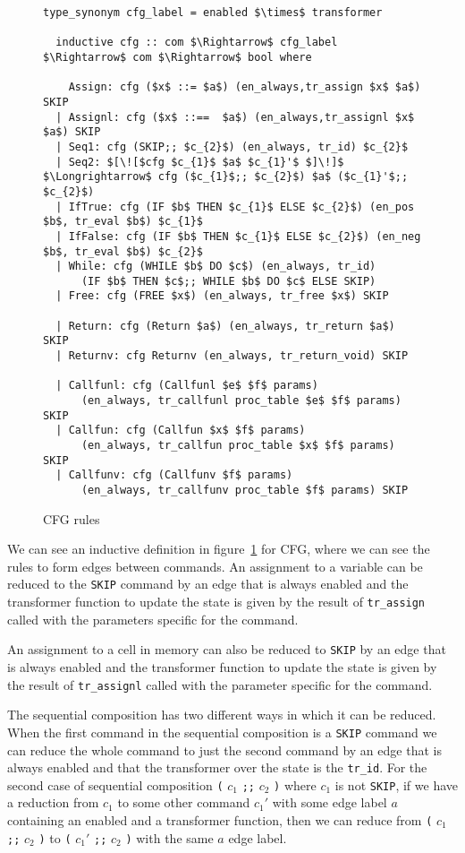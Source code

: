 \begin{figure}
  \begin{lstlisting}[frame=single, mathescape=true]
  type_synonym cfg_label = enabled $\times$ transformer

  inductive cfg :: com $\Rightarrow$ cfg_label $\Rightarrow$ com $\Rightarrow$ bool where

    Assign: cfg ($x$ ::= $a$) (en_always,tr_assign $x$ $a$) SKIP
  | Assignl: cfg ($x$ ::==  $a$) (en_always,tr_assignl $x$ $a$) SKIP
  | Seq1: cfg (SKIP;; $c_{2}$) (en_always, tr_id) $c_{2}$
  | Seq2: $[\![$cfg $c_{1}$ $a$ $c_{1}'$ $]\!]$ $\Longrightarrow$ cfg ($c_{1}$;; $c_{2}$) $a$ ($c_{1}'$;; $c_{2}$)
  | IfTrue: cfg (IF $b$ THEN $c_{1}$ ELSE $c_{2}$) (en_pos $b$, tr_eval $b$) $c_{1}$
  | IfFalse: cfg (IF $b$ THEN $c_{1}$ ELSE $c_{2}$) (en_neg $b$, tr_eval $b$) $c_{2}$
  | While: cfg (WHILE $b$ DO $c$) (en_always, tr_id)
      (IF $b$ THEN $c$;; WHILE $b$ DO $c$ ELSE SKIP)
  | Free: cfg (FREE $x$) (en_always, tr_free $x$) SKIP

  | Return: cfg (Return $a$) (en_always, tr_return $a$) SKIP
  | Returnv: cfg Returnv (en_always, tr_return_void) SKIP

  | Callfunl: cfg (Callfunl $e$ $f$ params)
      (en_always, tr_callfunl proc_table $e$ $f$ params) SKIP
  | Callfun: cfg (Callfun $x$ $f$ params)
      (en_always, tr_callfun proc_table $x$ $f$ params) SKIP
  | Callfunv: cfg (Callfunv $f$ params)
      (en_always, tr_callfunv proc_table $f$ params) SKIP
  \end{lstlisting}

  \caption{CFG rules}
  \label{fig:cfg_rules}
\end{figure}

We can see an inductive definition in figure~\ref{fig:cfg_rules} for CFG, where we can see the rules to form edges between commands.
An assignment to a variable can be reduced to the \verb|SKIP| command by an edge that is always enabled and the transformer function to update the state is given by the result of \verb|tr_assign| called with the parameters specific for the command.

An assignment to a cell in memory can also be reduced to \verb|SKIP| by an edge that is always enabled and the transformer function to update the state is given by the result of \verb|tr_assignl| called with the parameter specific for the command.

The sequential composition has two different ways in which it can be reduced.
When the first command in the sequential composition is a \verb|SKIP| command we can reduce the whole command to just the second command by an edge that is always enabled and that the transformer over the state is the \verb|tr_id|.
For the second case of sequential composition \verb|(| $c_{1}$ \verb|;;| $c_{2}$ \verb|)| where $c_{1}$ is not \verb|SKIP|, if we have a reduction from $c_{1}$ to some other command $c_{1}'$ with some edge label $a$ containing an enabled and a transformer function, then we can reduce from \verb|(| $c_{1}$ \verb|;;| $c_{2}$ \verb|)| to \verb|(| $c_{1}'$ \verb|;;| $c_{2}$ \verb|)| with the same $a$ edge label.

